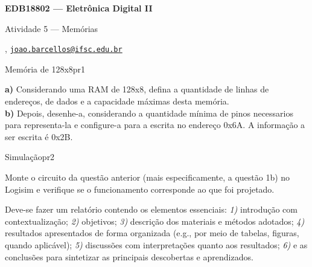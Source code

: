 



\usepackage[style=numeric, citestyle=ieee]{biblatex}




\begin{Large}
    \textbf{EDB18802 --- Eletrônica Digital II}
    
    Atividade 5 --- Memórias \hfill {}
\end{Large}

\vspace{1ex}
\textbf{} , \href{mailto:joao.barcellos@ifsc.edu.br}{\texttt{joao.barcellos@ifsc.edu.br}}\\
\textbf{}

\vspace{2ex}

\begin{problem}{Memória de 128x8}{pr1}

\textbf{a)} Considerando uma RAM de 128x8, defina a quantidade de linhas de endereços, de dados e a capacidade máximas desta memória. \\

\textbf{b)} Depois, desenhe-a, considerando a quantidade mínima de pinos necessarios para representa-la e configure-a para a escrita no endereço 0x6A. A informação a ser escrita é 0x2B. \\

\end{problem}

\begin{problem}{Simulação}{pr2}

Monte o circuito da questão anterior (mais especificamente, a questão 1b) no Logisim e verifique se o funcionamento corresponde ao que foi projetado. \\

\end{problem}

\begin{obs}

Deve-se fazer um relatório contendo os elementos essenciais: \textit{1)} introdução com contextualização; \textit{2)} objetivos; \textit{3)} descrição dos materiais e métodos adotados; \textit{4)} resultados apresentados de forma organizada (e.g., por meio de tabelas, figuras, quando aplicável); \textit{5)} discussões com interpretações quanto aos resultados; \textit{6)} e as conclusões para sintetizar as principais descobertas e aprendizados.

\end{obs}

\newpage

\printbibliography


